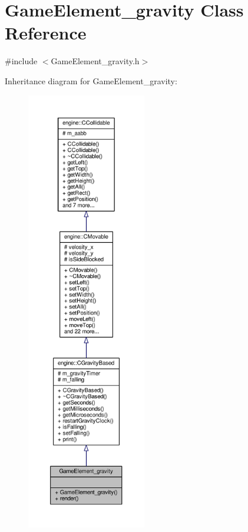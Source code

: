\hypertarget{classGameElement__gravity}{\section{Game\-Element\-\_\-gravity Class Reference}
\label{classGameElement__gravity}
}


{\ttfamily \#include $<$Game\-Element\-\_\-gravity.\-h$>$}



Inheritance diagram for Game\-Element\-\_\-gravity\-:
\nopagebreak
\begin{figure}[H]
\begin{center}
\leavevmode
\includegraphics[height=550pt]{classGameElement__gravity__inherit__graph}
\end{center}
\end{figure}


